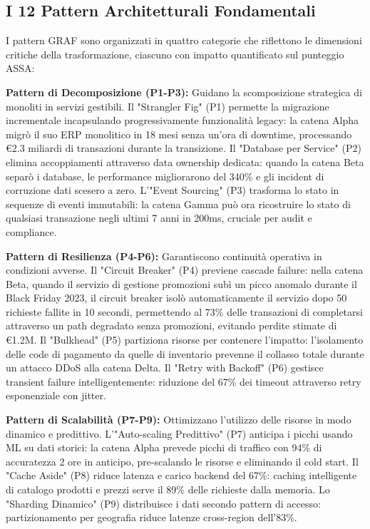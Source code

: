 \subsection{\texorpdfstring{I 12 Pattern Architetturali Fondamentali}{3.4.1 - I 12 Pattern Architetturali Fondamentali}}

I pattern GRAF sono organizzati in quattro categorie che riflettono le dimensioni critiche della trasformazione, ciascuno con impatto quantificato sul punteggio ASSA:

\textbf{Pattern di Decomposizione (P1-P3):} Guidano la scomposizione strategica di monoliti in servizi gestibili. Il "Strangler Fig" (P1) permette la migrazione incrementale incapsulando progressivamente funzionalità legacy: la catena Alpha migrò il suo ERP monolitico in 18 mesi senza un'ora di downtime, processando €2.3 miliardi di transazioni durante la transizione. Il "Database per Service" (P2) elimina accoppiamenti attraverso data ownership dedicata: quando la catena Beta separò i database, le performance migliorarono del 340\% e gli incident di corruzione dati scesero a zero. L'"Event Sourcing" (P3) trasforma lo stato in sequenze di eventi immutabili: la catena Gamma può ora ricostruire lo stato di qualsiasi transazione negli ultimi 7 anni in 200ms, cruciale per audit e compliance.

\textbf{Pattern di Resilienza (P4-P6):} Garantiscono continuità operativa in condizioni avverse. Il "Circuit Breaker" (P4) previene cascade failure: nella catena Beta, quando il servizio di gestione promozioni subì un picco anomalo durante il Black Friday 2023, il circuit breaker isolò automaticamente il servizio dopo 50 richieste fallite in 10 secondi, permettendo al 73\% delle transazioni di completarsi attraverso un path degradato senza promozioni, evitando perdite stimate di €1.2M. Il "Bulkhead" (P5) partiziona risorse per contenere l'impatto: l'isolamento delle code di pagamento da quelle di inventario prevenne il collasso totale durante un attacco DDoS alla catena Delta. Il "Retry with Backoff" (P6) gestisce transient failure intelligentemente: riduzione del 67\% dei timeout attraverso retry esponenziale con jitter.

\textbf{Pattern di Scalabilità (P7-P9):} Ottimizzano l'utilizzo delle risorse in modo dinamico e predittivo. L'"Auto-scaling Predittivo" (P7) anticipa i picchi usando ML su dati storici: la catena Alpha prevede picchi di traffico con 94\% di accuratezza 2 ore in anticipo, pre-scalando le risorse e eliminando il cold start. Il "Cache Aside" (P8) riduce latenza e carico backend del 67\%: caching intelligente di catalogo prodotti e prezzi serve il 89\% delle richieste dalla memoria. Lo "Sharding Dinamico" (P9) distribuisce i dati secondo pattern di accesso: partizionamento per geografia riduce latenze cross-region dell'83\%.

